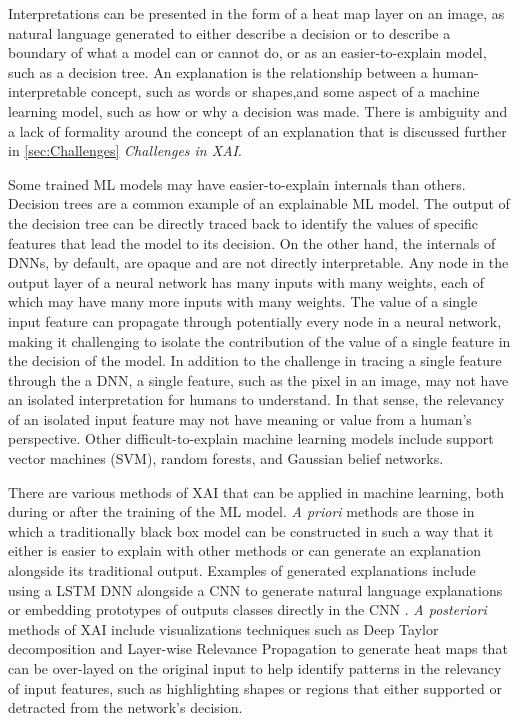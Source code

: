\documentclass{IEEEtran}
\begin{document}
Interpretations can be presented in the form of a heat map layer on an image, as natural language generated to either describe a decision or to describe a boundary of what a model can or cannot do, or as an easier-to-explain model, such as a decision tree.  An explanation is the relationship between a human-interpretable concept, such as words or shapes,and some aspect of a machine learning model, such as how or why a decision was made.  There is ambiguity and a lack of formality around the concept of an explanation that is discussed further in \ref{sec:Challenges} \textit{Challenges in XAI}.

Some trained ML models may have easier-to-explain internals than others.  Decision trees are a common example of an explainable ML model.  The output of the decision tree can be directly traced back to identify the values of specific features that lead the model to its decision.  On the other hand, the internals of DNNs, by default, are opaque and are not directly interpretable.  Any node in the output layer of a neural network has many inputs with many weights, each of which may have many more inputs with many weights.  The value of a single input feature can propagate through potentially every node in a neural network, making it challenging to isolate the contribution of the value of a single feature in the decision of the model.  In addition to the challenge in tracing a single feature through the a DNN, a single feature, such as the pixel in an image, may not have an isolated interpretation for humans to understand.  In that sense, the relevancy of an isolated input feature may not have meaning or value from a human's perspective.  Other difficult-to-explain machine learning models include support vector machines (SVM), random forests, and Gaussian belief networks.

There are various methods of XAI that can be applied in machine learning, both during or after the training of the ML model.  \textit{A priori} methods are those in which a traditionally black box model can be constructed in such a way that it either is easier to explain with other methods or can generate an explanation alongside its traditional output.  Examples of generated explanations include using a LSTM DNN alongside a CNN to generate natural language explanations \cite{10.1007/978-3-319-46493-0_1} or embedding prototypes of outputs classes directly in the CNN \cite{Chen2018}.  \textit{A posteriori} methods of XAI include visualizations techniques such as Deep Taylor decomposition and Layer-wise Relevance Propagation to generate heat maps that can be over-layed on the original input to help identify patterns in the relevancy of input features, such as highlighting shapes or regions that either supported or detracted from the network's decision.
\end{document}
